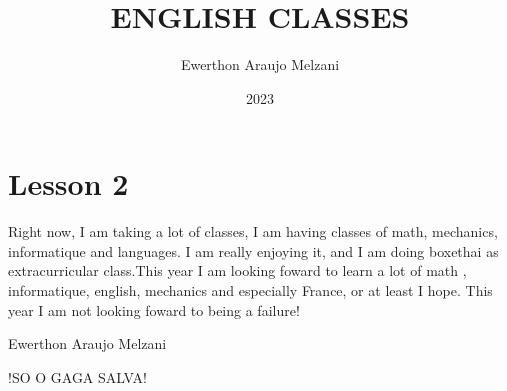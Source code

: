 \documentclass{article}
\title{ENGLISH CLASSES}
\author{Ewerthon Araujo Melzani}
\date{2023}
\begin{document}
\maketitle

\section*{Lesson 2}

\vspace*{1.5 cm}


    Right now, I am taking a lot of classes, I am having classes of math, mechanics, informatique and languages.
I am really enjoying it, and I am doing boxethai as extracurricular class.This year I am looking foward to learn a lot of math
, informatique, english, mechanics and especially France, or at least I hope.
This year I am not looking foward to being a failure!





\vspace*{1.5 cm}



\LARGE{Ewerthon Araujo Melzani}

\vspace*{1.5 cm}

\huge{!SO O GAGA SALVA!}
\end{document}
